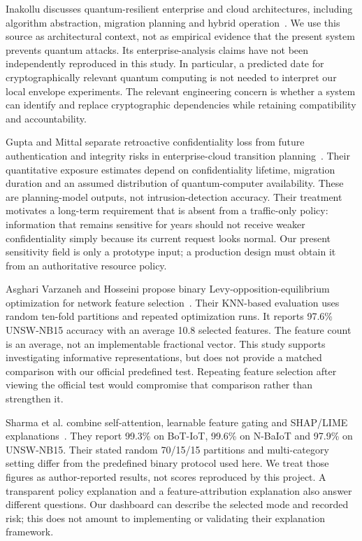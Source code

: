 \documentclass[conference,a4paper]{IEEEtran}
\begin{document}
Inakollu discusses quantum-resilient enterprise and cloud architectures, including algorithm abstraction, migration planning and hybrid operation~\cite{enterprise}. We use this source as architectural context, not as empirical evidence that the present system prevents quantum attacks. Its enterprise-analysis claims have not been independently reproduced in this study. In particular, a predicted date for cryptographically relevant quantum computing is not needed to interpret our local envelope experiments. The relevant engineering concern is whether a system can identify and replace cryptographic dependencies while retaining compatibility and accountability.

Gupta and Mittal separate retroactive confidentiality loss from future authentication and integrity risks in enterprise-cloud transition planning~\cite{readiness}. Their quantitative exposure estimates depend on confidentiality lifetime, migration duration and an assumed distribution of quantum-computer availability. These are planning-model outputs, not intrusion-detection accuracy. Their treatment motivates a long-term requirement that is absent from a traffic-only policy: information that remains sensitive for years should not receive weaker confidentiality simply because its current request looks normal. Our present sensitivity field is only a prototype input; a production design must obtain it from an authoritative resource policy.

Asghari Varzaneh and Hosseini propose binary Levy-opposition-equilibrium optimization for network feature selection~\cite{feature}. Their KNN-based evaluation uses random ten-fold partitions and repeated optimization runs. It reports 97.6\% UNSW-NB15 accuracy with an average 10.8 selected features. The feature count is an average, not an implementable fractional vector. This study supports investigating informative representations, but does not provide a matched comparison with our official predefined test. Repeating feature selection after viewing the official test would compromise that comparison rather than strengthen it.

Sharma et al. combine self-attention, learnable feature gating and SHAP/LIME explanations~\cite{xai}. They report 99.3\% on BoT-IoT, 99.6\% on N-BaIoT and 97.9\% on UNSW-NB15. Their stated random 70/15/15 partitions and multi-category setting differ from the predefined binary protocol used here. We treat those figures as author-reported results, not scores reproduced by this project. A transparent policy explanation and a feature-attribution explanation also answer different questions. Our dashboard can describe the selected mode and recorded risk; this does not amount to implementing or validating their explanation framework.
\end{document}
